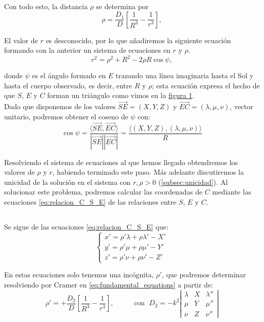 \documentclass[11pt]{article}
\begin{document}
Con todo esto, la distancia $\rho$ se determina por
\[
\rho = \frac{D_1}{D}[\frac{1}{R^3}-\frac{1}{r^3}],
\]

El valor de $r$ es desconocido, por lo que añadiremos la siguiente ecuación formando con la anterior un sistema de ecuaciones en $r$ y $\rho$.
\[
r^2=\rho^2+R^2-2\rho R\cos\psi,
\]

\noindent donde $\psi$ es el ángulo formado en $E$ trazando una línea imaginaria hasta el Sol y hasta el cuerpo observado, es decir, entre $R$ y $\rho$; esta ecuación expresa el hecho de que $S$, $E$ y $C$ forman un triángulo como vimos en la \hyperref[figure:1]{figura 1}.\\

Dado que disponemos de los valores $\overrightarrow{SE}=(X,Y,Z)$ y $\overrightarrow{EC}=(\lambda,\mu,\nu)$, vector unitario, podremos obtener el coseno de $\psi$ con:
\[
\cos{\psi}=\frac{\langle\overrightarrow{SE},\overrightarrow{EC}\rangle}{|\overrightarrow{SE}||\overrightarrow{EC}|}=\frac{\langle(X,Y,Z),(\lambda,\mu,\nu)\rangle}{R}
\]

Resolviendo el sistema de ecuaciones al que hemos llegado obtendremos los valores de $\rho$ y $r$, habiendo terminado este paso. Más adelante discutiremos la unicidad de la solución en el sistema con $r,\rho>0$ (\ref{subsec:unicidad}). Al solucionar este problema, podremos calcular las coordenadas de $C$ mediante las ecuaciones \eqref{eq:relacion_C_S_E} de las relaciones entre $S$, $E$ y $C$.\\

\subsection{}
\label{subsec:velocity_component}
Se sigue de las ecuaciones \eqref{eq:relacion_C_S_E} que:
\[
\left\{
\begin{array}{l}
	x'=\rho'\lambda+\rho\lambda'-X'\\
	y'=\rho'\mu+\rho\mu'-Y'\\
	z'=\rho'\nu+\rho\nu'-Z'
\end{array}
\right.	
\]

En estas ecuaciones solo tenemos una incógnita, $\rho'$, que podremos determinar resolviendo por Cramer en \eqref{eq:fundamental_equations} a partir de:
\[
\rho'=+\frac{D_2}{D}[\frac{1}{R^3}-\frac{1}{r^3}],
\; \; \; \; \; \; \; \; \; \text{ con } \;
D_2 = -k^2
\left|
\begin{array}{ccc}
\lambda & X & \lambda''\\
\mu & Y & \mu''\\
\nu & Z & \nu''
\end{array}
\right|
\]
\end{document}
